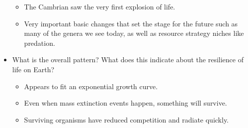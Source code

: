 \documentclass[12pt]{article}
\begin{document}
\begin{itemize}
\begin{itemize}
        \item The Cambrian saw the very first explosion of life.
        \item Very important basic changes that set the stage for the future such as many of the genera we see today, as well as resource strategy niches like predation.
    \end{itemize}
    \item What is the overall pattern? What does this indicate about the resilience of life on Earth?
    \begin{itemize}
        \item Appears to fit an exponential growth curve. 
        \item Even when mass extinction events happen, something will survive.
        \item Surviving organisms have reduced competition and radiate quickly.
    \end{itemize}
\end{itemize}
\end{document}
